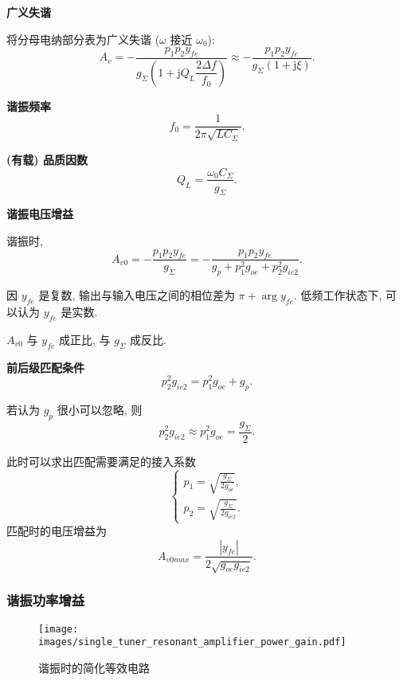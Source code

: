 \textbf{广义失谐}

将分母电纳部分表为广义失谐 ($\omega$ 接近 $\omega_0$):
\begin{equation}
    A_v=-\frac{p_1p_2y_{fe}}{g_\Sigma\left(1+\mathrm{j}Q_L\dfrac{2\Delta f}{f_0}\right)}\approx -\frac{p_1p_2y_{fe}}{g_\Sigma\left(1+\mathrm{j}\xi\right)}.
\end{equation}

\textbf{谐振频率}
\begin{equation}
    f_0=\frac{1}{2\pi\sqrt{LC_\Sigma}}.
\end{equation}

\textbf{(有载) 品质因数}
\begin{equation}
    Q_L=\frac{\omega_0 C_\Sigma}{g_\Sigma}.
\end{equation}

\textbf{谐振电压增益}

谐振时,
\begin{equation}
    A_{v0}=-\frac{p_1p_2y_{fe}}{g_\Sigma}=-\frac{p_1p_2y_{fe}}{g_p+p_1^2g_{oe}+p_2^2g_{ie2}}.
\end{equation}

因 $y_{fe}$ 是复数, 输出与输入电压之间的相位差为 $\pi+\arg y_{fe}$. 低频工作状态下, 可以认为 $y_{fe}$ 是实数.

$A_{v0}$ 与 $y_{fe}$ 成正比, 与 $g_\Sigma$ 成反比.

\textbf{前后级匹配条件}
\begin{equation}
    p_2^2g_{ie2}=p_1^2g_{oe}+g_p.
\end{equation}

若认为 $g_p$ 很小可以忽略, 则
\begin{equation}
    p_2^2g_{ie2}\approx p_1^2g_{oe}=\frac{g_\Sigma}{2}.
\end{equation}

此时可以求出匹配需要满足的接入系数
\begin{equation}
    \begin{cases}
        p_1=\sqrt{\frac{g_\Sigma}{2g_{oe}}}, \\
        p_2=\sqrt{\frac{g_\Sigma}{2g_{ie2}}}.
    \end{cases}
\end{equation}
匹配时的电压增益为
\begin{equation}
    A_{v0max}=\frac{|y_{fe}|}{2\sqrt{g_{oe}g_{ie2}}}.
\end{equation}

\subsubsection{谐振功率增益}
\begin{wrapfigure}{r}{.45\textwidth}
    \centering
    \texttt{[image: images/single\_tuner\_resonant\_amplifier\_power\_gain.pdf]}
    \caption{谐振时的简化等效电路}
\end{wrapfigure}

